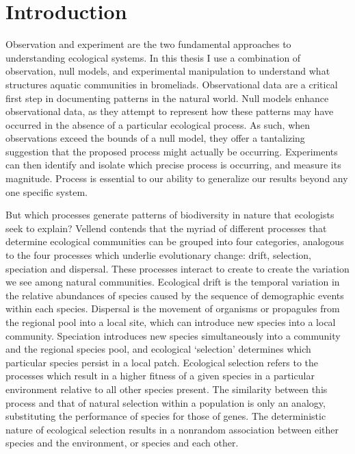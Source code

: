\chapter{Introduction}
\label{chap:introduction}


\noindent

Observation and experiment are the two fundamental approaches to
understanding ecological systems. In this thesis I use a combination of
observation, null models, and experimental manipulation to understand
what structures aquatic communities in bromeliads. Observational data
are a critical first step in documenting patterns in the natural world.
Null models enhance observational data, as they attempt to represent how
these patterns may have occurred in the absence of a particular
ecological process. As such, when observations exceed the bounds of a
null model, they offer a tantalizing suggestion that the proposed
process might actually be occurring. Experiments can then identify and
isolate which precise process is occurring, and measure its magnitude.
Process is essential to our ability to generalize our results beyond any
one specific system.

But which processes generate patterns of biodiversity in nature that
ecologists seek to explain? Vellend \citep{Vellend2010b} contends that
the myriad of different processes that determine ecological communities
can be grouped into four categories, analogous to the four processes
which underlie evolutionary change: drift, selection, speciation and
dispersal. These processes interact to create to create the variation we
see among natural communities. Ecological drift is the temporal
variation in the relative abundances of species caused by the sequence
of demographic events within each species. Dispersal is the movement of
organisms or propagules from the regional pool into a local site, which
can introduce new species into a local community. Speciation introduces
new species simultaneously into a community and the regional species
pool, and ecological `selection' determines which particular species
persist in a local patch. Ecological selection refers to the processes
which result in a higher fitness of a given species in a particular
environment relative to all other species present. The similarity
between this process and that of natural selection within a population
is only an analogy, substituting the performance of species for those of
genes. The deterministic nature of ecological selection results in a
nonrandom association between either species and the environment, or
species and each other.

